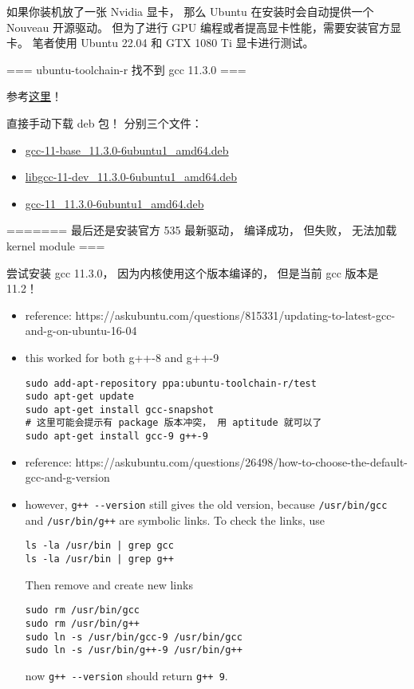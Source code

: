 
如果你装机放了一张 Nvidia 显卡， 那么 Ubuntu 在安装时会自动提供一个 Nouveau 开源驱动。 但为了进行 GPU 编程或者提高显卡性能，需要安装官方显卡。 笔者使用 Ubuntu 22.04 和 GTX 1080 Ti 显卡进行测试。

=== ubuntu-toolchain-r 找不到 gcc 11.3.0 ===

参考\href{https://askubuntu.com/questions/1481354/install-a-specific-gcc-version-to-match-the-version-the-kernel-was-compiled-with}{这里}！

直接手动下载 deb 包！ 分别三个文件：
\begin{itemize}
\item \href{http://mirrors.kernel.org/ubuntu/pool/main/g/gcc-11/gcc-11-base_11.3.0-6ubuntu1_amd64.deb}{gcc-11-base_11.3.0-6ubuntu1_amd64.deb}
\item \href{http://mirrors.kernel.org/ubuntu/pool/main/g/gcc-11/libgcc-11-dev_11.3.0-6ubuntu1_amd64.deb}{libgcc-11-dev_11.3.0-6ubuntu1_amd64.deb}
\item \href{http://mirrors.kernel.org/ubuntu/pool/universe/g/gcc-11/gcc-11_11.3.0-6ubuntu1_amd64.deb}{gcc-11_11.3.0-6ubuntu1_amd64.deb}
\end{itemize}


======= 最后还是安装官方 535 最新驱动， 编译成功， 但失败， 无法加载 kernel module ===

尝试安装 gcc 11.3.0， 因为内核使用这个版本编译的， 但是当前 gcc 版本是 11.2！

\begin{itemize}
\item reference: https://askubuntu.com/questions/815331/updating-to-latest-gcc-and-g-on-ubuntu-16-04
\item this worked for both g++-8 and g++-9
\begin{lstlisting}[language=none]
sudo add-apt-repository ppa:ubuntu-toolchain-r/test
sudo apt-get update
sudo apt-get install gcc-snapshot
# 这里可能会提示有 package 版本冲突， 用 aptitude 就可以了
sudo apt-get install gcc-9 g++-9
\end{lstlisting}
\item reference: https://askubuntu.com/questions/26498/how-to-choose-the-default-gcc-and-g-version
\item however, \verb`g++ --version` still gives the old version, because \verb`/usr/bin/gcc` and \verb`/usr/bin/g++` are symbolic links. To check the links, use
\begin{lstlisting}[language=none]
ls -la /usr/bin | grep gcc
ls -la /usr/bin | grep g++
\end{lstlisting}
Then remove and create new links
\begin{lstlisting}[language=none]
sudo rm /usr/bin/gcc
sudo rm /usr/bin/g++
sudo ln -s /usr/bin/gcc-9 /usr/bin/gcc
sudo ln -s /usr/bin/g++-9 /usr/bin/g++
\end{lstlisting}
now \verb`g++ --version` should return \verb`g++ 9`.
\end{itemize}



